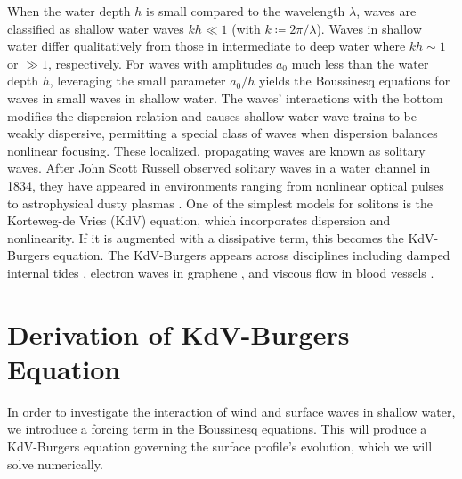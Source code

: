 \documentclass{jfm}
\begin{document}
When the water depth $h$ is small compared to the wavelength $\lambda$,
waves are classified as shallow water waves $kh \ll 1$ (with $k
\coloneqq 2 \pi/\lambda$).
Waves in shallow water differ qualitatively from those in intermediate
to deep water where $kh \sim 1$ or $\gg 1$, respectively.
For waves with amplitudes $a_0$ much less than the water depth $h$,
leveraging the small parameter $a_0/h$ yields the Boussinesq equations
for waves in small waves in shallow water.
The waves' interactions with the bottom modifies the dispersion relation
and causes shallow water wave trains to be weakly dispersive, permitting
a special class of waves when dispersion balances nonlinear focusing.
These localized, propagating waves are known as solitary waves.
After John Scott Russell observed solitary waves in a water channel in 1834,
they have appeared in environments ranging from nonlinear optical pulses
\citep[\eg][]{kivshar1993dark} to astrophysical dusty plasmas
\citep[\eg][]{sahu2012nonextensive}.
One of the simplest models for solitons is the Korteweg-de Vries (KdV)
equation, which incorporates dispersion and nonlinearity.
If it is augmented with a dissipative term, this becomes the KdV-Burgers
equation.
The KdV-Burgers appears across disciplines including damped internal
tides \citep[\eg][]{sandstrom1995dissipation}, electron waves in
graphene \citep[\eg][]{zdyrski2019effects}, and viscous flow in blood
vessels \citep[\eg][]{antar1999weakly}.

\section{Derivation of KdV-Burgers Equation}
In order to investigate the interaction of wind and surface waves in
shallow water, we introduce a forcing term in the Boussinesq equations.
This will produce a KdV-Burgers equation governing the surface profile's
evolution, which we will solve numerically.
\end{document}
